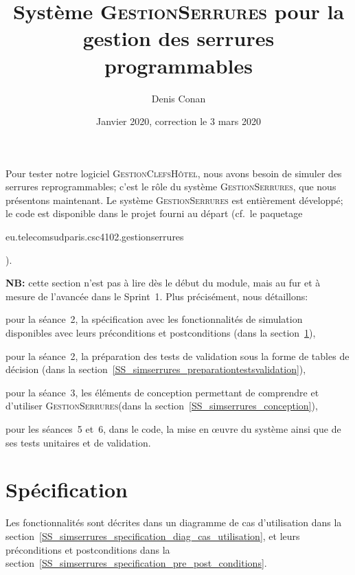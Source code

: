 \documentclass[11pt,article]{article}
\newcommand{\gestionclefshotel}{\textsc{GestionClefsHôtel}\xspace}
\newcommand{\gestionserrures}{\textsc{GestionSerrures}\xspace}
\begin{document}
\title{Système \gestionserrures pour la gestion des serrures programmables}
\author{Denis Conan}
\date{Janvier 2020, correction le 3 mars 2020}
\maketitle

\newpage

\tableofcontents

\newpage

Pour tester notre logiciel \gestionclefshotel, nous avons besoin de
simuler des serrures reprogrammables; c'est le rôle du système
\gestionserrures, que nous présentons maintenant. Le système
\gestionserrures est entièrement développé; le code est disponible
dans le projet fourni au départ (cf.~le
paquetage \begin{small}\textsf{eu.telecomsudparis.csc4102.gestionserrures}\end{small}).

\textbf{NB:} cette section n'est pas à lire dès le début du module,
mais au fur et à mesure de l'avancée dans le Sprint~1. Plus
précisément, nous détaillons:
\begin{compactitem}
\item pour la séance~2, la spécification avec les fonctionnalités de
simulation disponibles avec leurs préconditions et postconditions
(dans la section~\ref{SS_simserrures_specification}),
\item pour la séance~2, la préparation des tests de validation sous la
  forme de tables de décision (dans la
  section~\ref{SS_simserrures_preparationtestsvalidation}),
\item pour la séance~3, les éléments de conception permettant de
  comprendre et d'utiliser \gestionserrures (dans la
  section~\ref{SS_simserrures_conception}),
\item pour les séances~5 et~6, dans le code, la mise en œuvre du
système ainsi que de ses tests unitaires et de validation.
\end{compactitem}

\section{Spécification}
\label{SS_simserrures_specification}

Les fonctionnalités sont décrites dans un diagramme de cas
d'utilisation dans la
section~\ref{SS_simserrures_specification_diag_cas_utilisation}, et
leurs préconditions et postconditions dans la
section~\ref{SS_simserrures_specification_pre_post_conditions}.
\end{document}
